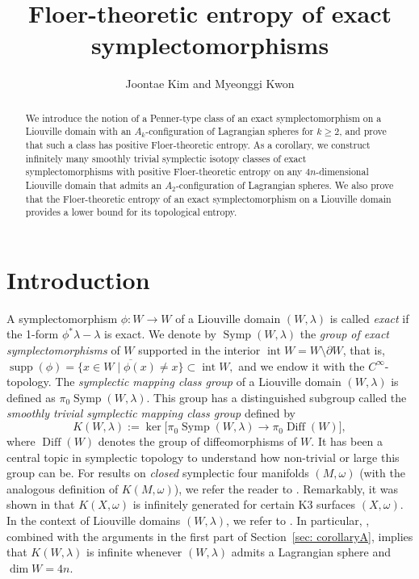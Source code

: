 \documentclass[12pt]{article}
\renewcommand{\ge}{\geqslant}
\theoremstyle{theorem}
\theoremstyle{definition}
\theoremstyle{remark}
\numberwithin{equation}{section}
\newcommand{\ow}{\omega}
\newcommand{\p}{\partial}
\DeclareMathOperator{\supp}{supp}
\DeclareMathOperator{\Diff}{Diff}
\DeclareMathOperator{\Symp}{Symp}
\DeclareMathOperator{\Int}{int}
\begin{document}
\title{
Floer-theoretic entropy of exact symplectomorphisms
}


\author{Joontae Kim and Myeonggi Kwon}

\maketitle

\begin{abstract}
We introduce the notion of a Penner-type class of an  exact symplectomorphism on a Liouville domain with an $A_k$-configuration of Lagrangian spheres for $k\ge 2$, and prove that such a class has positive Floer-theoretic entropy.
As a corollary, we construct infinitely many smoothly trivial symplectic isotopy classes of exact symplectomorphisms with positive Floer-theoretic entropy on any $4n$-dimensional Liouville domain that admits an $A_2$-configuration of Lagrangian spheres.
We also prove that the Floer-theoretic entropy of an exact symplectomorphism on a Liouville domain provides a lower bound for its topological entropy.
\end{abstract}





\section{Introduction}\label{sec: intro}
A symplectomorphism $\phi\colon W\to W$ of a Liouville domain $(W,\lambda)$ is called \emph{exact} if the 1-form $\phi^*\lambda-\lambda$ is exact.
We denote by $\Symp(W,\lambda)$ the \emph{group of exact symplectomorphisms} of $W$ supported in the interior $\Int W=W\setminus \p W$, that is,
$
\supp(\phi)=\overline{\{x\in W \mid \phi(x)\ne x\}} \subset \Int W,
$
and we endow it with the $C^\infty$-topology.
The \emph{symplectic mapping class group} of a Liouville domain $(W,\lambda)$ is defined as $\pi_0 \Symp(W,\lambda)$.
This group has a distinguished subgroup called the \emph{smoothly trivial symplectic mapping class group} defined by
$$
K(W,\lambda):=\ker\big[\pi_0 \Symp(W,\lambda) \to \pi_0 \Diff(W)\big],
$$
where $\Diff(W)$ denotes the group of diffeomorphisms of $W$.
It has been a central topic in symplectic topology to understand how non-trivial or large this group can be.
For results on \emph{closed} symplectic four manifolds $(M,\ow)$ (with the  analogous definition of $K(M,\ow)$), we refer the reader to \cite{Se00, Se08a, To15}.
Remarkably, it was shown in \cite{ShSm20, Sm22} that $K(X,\ow)$ is infinitely generated for certain K3 surfaces $(X,\ow)$.
In the context of Liouville domains $(W,\lambda)$, we refer to \cite{Se99, Ke14, BarGeiZeh19}.
In particular, \cite[Theorem~1.4]{BarGeiZeh19}, combined with the arguments in the first part of Section~\ref{sec: corollaryA}, implies that $K(W,\lambda)$ is infinite whenever $(W,\lambda)$ admits a Lagrangian sphere and $\dim W=4n$.
\end{document}
